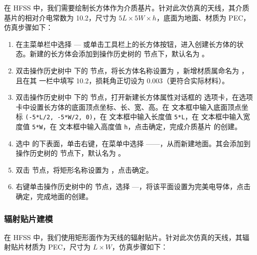 \documentclass[12pt,a4paper,UTF8]{article}
\begin{document}
在 HFSS 中，我们需要绘制长方体作为介质基片。针对此次仿真的天线，其介质基片的相对介电常数为 10.2，尺寸为 $5L \times 5W \times h$，底面为地面、材质为 PEC，仿真步骤如下：

\begin{enumerate}
    \item 在主菜单栏中选择 — 或单击工具栏上的长方体按钮，进入创建长方体的状态。新建的长方体会添加到操作历史树的  节点下，默认名为 。
    
    \item 双击操作历史树中  下的  节点，将长方体名称设置为 ，新增材质属命名为 ，且在其  一栏中填写 10.2，损耗角正切设为 0.003（更符合实际材料）。
    
    \item 双击操作历史树中  下的  节点，打开新建长方体属性对话框的  选项卡，在选项卡中设置长方体的底面顶点坐标、长、宽、高。在  文本框中输入底面顶点坐标 \texttt{(-5*L/2, -5*W/2, 0)}，在  文本框中输入长度值 \texttt{5*L}，在  文本框中输入宽度值 \texttt{5*W}，在  文本框中输入高度值 \texttt{h}，点击确定，完成介质基片  的创建。
    
    \item 选中  的下表面，单击右键，在菜单中选择 ——，从而新建地面。其会添加到操作历史树的  节点下，默认名为 。
    
    \item 双击  节点，将矩形名称设置为 ，点击确定。
    
    \item 右键单击操作历史树中的  节点，选择 —，将该平面设置为完美电导体，点击确定，完成地面的创建。
\end{enumerate}

\subsubsection{辐射贴片建模}

在 HFSS 中，我们使用矩形面作为天线的辐射贴片。针对此次仿真的天线，其辐射贴片材质为 PEC，尺寸为 $L \times W$，仿真步骤如下：
\end{document}
